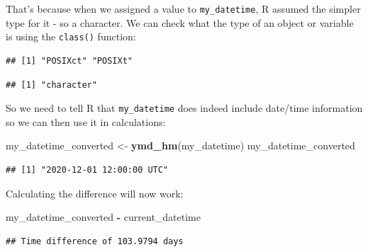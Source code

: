 \documentclass[
  12pt,
  krantz2]{krantz}
\makeatletter
\newenvironment{Shaded}{\begin{snugshade}}{\end{snugshade}}
\newcommand{\KeywordTok}[1]{\textcolor[rgb]{0.13,0.29,0.53}{\textbf{#1}}}
\newcommand{\NormalTok}[1]{#1}
\newcommand{\OperatorTok}[1]{\textcolor[rgb]{0.81,0.36,0.00}{\textbf{#1}}}
\newcommand{\StringTok}[1]{\textcolor[rgb]{0.31,0.60,0.02}{#1}}
\newenvironment{kframe}{%
\medskip{}
\setlength{\fboxsep}{.8em}
 \def\at@end@of@kframe{}%
 \ifinner\ifhmode%
  \def\at@end@of@kframe{\end{minipage}}%
  \begin{minipage}{\columnwidth}%
 \fi\fi%
 \def\FrameCommand##1{\hskip\@totalleftmargin \hskip-\fboxsep
 \colorbox{shadecolor}{##1}\hskip-\fboxsep
     \hskip-\linewidth \hskip-\@totalleftmargin \hskip\columnwidth}%
 \MakeFramed {\advance\hsize-\width
   \@totalleftmargin\z@ \linewidth\hsize
   \@setminipage}}%
 {\par\unskip\endMakeFramed%
 \at@end@of@kframe}
\renewenvironment{Shaded}{\begin{kframe}}{\end{kframe}}
\makeatother
\begin{document}
That's because when we assigned a value to \texttt{my\_datetime}, R assumed the simpler type for it - so a character.
We can check what the type of an object or variable is using the \texttt{class()} function:

\begin{Shaded}
\end{Shaded}

\begin{verbatim}
## [1] "POSIXct" "POSIXt"
\end{verbatim}

\begin{Shaded}
\end{Shaded}

\begin{verbatim}
## [1] "character"
\end{verbatim}

So we need to tell R that \texttt{my\_datetime} does indeed include date/time information so we can then use it in calculations:

\begin{Shaded}
\begin{Highlighting}[]
\NormalTok{my_datetime_converted <-}\StringTok{ }\KeywordTok{ymd_hm}\NormalTok{(my_datetime)}
\NormalTok{my_datetime_converted}
\end{Highlighting}
\end{Shaded}

\begin{verbatim}
## [1] "2020-12-01 12:00:00 UTC"
\end{verbatim}

Calculating the difference will now work:

\begin{Shaded}
\begin{Highlighting}[]
\NormalTok{my_datetime_converted }\OperatorTok{-}\StringTok{ }\NormalTok{current_datetime}
\end{Highlighting}
\end{Shaded}

\begin{verbatim}
## Time difference of 103.9794 days
\end{verbatim}
\end{document}

